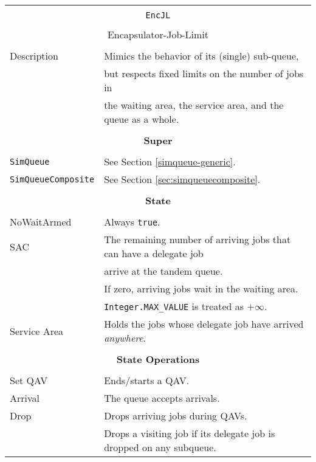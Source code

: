 \begin{tabular}{|l|l|}
	\hline
	\multicolumn{2}{|c|}{} \\
	\multicolumn{2}{|c|}{\lstinline[basicstyle=\large]{EncJL}} \\
	\multicolumn{2}{|c|}{} \\
	\multicolumn{2}{|c|}{Encapsulator-Job-Limit} \\
	\multicolumn{2}{|c|}{} \\
	\hline
	Description & Mimics the behavior of its (single) sub-queue, \\
	& but respects fixed limits on the number of jobs in \\
	& the waiting area, the service area, and the queue as a whole. \\
	\hline
	\multicolumn{2}{|c|}{} \\
	\multicolumn{2}{|c|}{\bf Super} \\
	\multicolumn{2}{|c|}{} \\
	\hline
	\lstinline|SimQueue| & See Section \ref{simqueue-generic}. \\
	\lstinline|SimQueueComposite| & See Section \ref{sec:simqueuecomposite}. \\
	\hline
	\multicolumn{2}{|c|}{} \\
	\multicolumn{2}{|c|}{\bf State} \\
	\multicolumn{2}{|c|}{} \\
	\hline
	NoWaitArmed & Always \lstinline|true|. \\
	\hline
	SAC & The remaining number of arriving jobs that can have a delegate job \\
	& arrive at the tandem queue. \\
	& If zero, arriving jobs wait in the waiting area. \\
	& \lstinline|Integer.MAX_VALUE| is treated as $+\infty$. \\
	\hline
	Service Area & Holds the jobs whose delegate job have arrived {\em anywhere}. \\
	\hline
	\multicolumn{2}{|c|}{} \\
	\multicolumn{2}{|c|}{\bf State Operations} \\
	\multicolumn{2}{|c|}{} \\
	\hline
	Set QAV & Ends/starts a QAV. \\
	\hline
	Arrival & The queue accepts arrivals. \\
	\hline
	Drop & Drops arriving jobs during QAVs. \\
	& Drops a visiting job if its delegate job is dropped on any subqueue. \\

\end{tabular}
